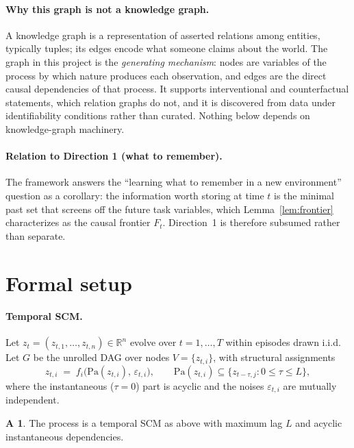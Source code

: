\documentclass[11pt]{article}
\newcommand{\Pa}{\mathrm{Pa}}
\theoremstyle{plain}
\theoremstyle{definition}
\newtheorem{assumption}{A}
\begin{document}
\paragraph{Why this graph is not a knowledge graph.}
A knowledge graph is a representation of asserted relations among entities, typically tuples; its edges encode what someone claims about the world. The graph in this project is the \emph{generating mechanism}: nodes are variables of the process by which nature produces each observation, and edges are the direct causal dependencies of that process. It supports interventional and counterfactual statements, which relation graphs do not, and it is discovered from data under identifiability conditions rather than curated. Nothing below depends on knowledge-graph machinery.

\paragraph{Relation to Direction 1 (what to remember).}
The framework answers the ``learning what to remember in a new environment'' question as a corollary: the information worth storing at time $t$ is the minimal past set that screens off the future task variables, which Lemma~\ref{lem:frontier} characterizes as the causal frontier $F_t$. Direction~1 is therefore subsumed rather than separate.

\section{Formal setup}\label{sec:setup}

\paragraph{Temporal SCM.}
Let $z_t = (z_{t,1},\dots,z_{t,n}) \in \mathbb{R}^n$ evolve over $t = 1,\dots,T$ within episodes drawn i.i.d. Let $G$ be the unrolled DAG over nodes $V = \{z_{t,i}\}$, with structural assignments
\[
z_{t,i} \;=\; f_i\big(\Pa(z_{t,i}),\, \varepsilon_{t,i}\big),
\qquad \Pa(z_{t,i}) \subseteq \{z_{t-\tau, j} : 0 \le \tau \le L\},
\]
where the instantaneous ($\tau = 0$) part is acyclic and the noises $\varepsilon_{t,i}$ are mutually independent.

\begin{assumption}\label{a:scm}
The process is a temporal SCM as above with maximum lag $L$ and acyclic instantaneous dependencies.
\end{assumption}
\end{document}
